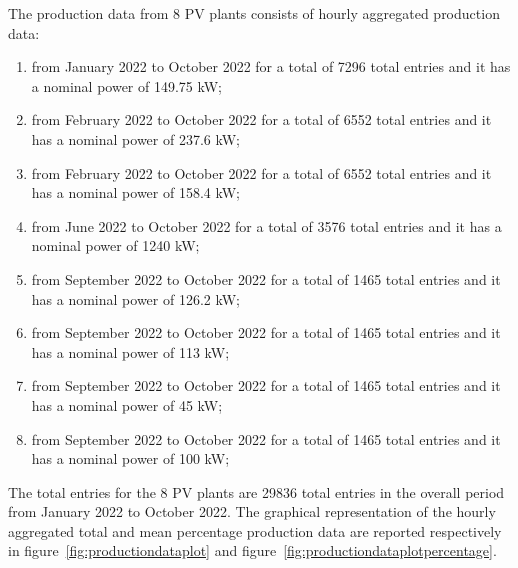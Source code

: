 The production data from 8 PV plants consists of hourly aggregated production data:
\begin{enumerate}
  \item from January 2022 to October 2022 for a total of 7296 total entries and it has a nominal power of 149.75 kW;
  \item from February 2022 to October 2022 for a total of 6552 total entries and it has a nominal power of 237.6 kW;
  \item from February 2022 to October 2022 for a total of 6552 total entries and it has a nominal power of 158.4 kW;
  \item from June 2022 to October 2022 for a total of 3576 total entries and it has a nominal power of 1240 kW;
  \item from September 2022 to October 2022 for a total of 1465 total entries and it has a nominal power of 126.2 kW;
  \item from September 2022 to October 2022 for a total of 1465 total entries and it has a nominal power of 113 kW;
  \item from September 2022 to October 2022 for a total of 1465 total entries and it has a nominal power of 45 kW;
  \item from September 2022 to October 2022 for a total of 1465 total entries and it has a nominal power of 100 kW;
\end{enumerate}
The total entries for the 8 PV plants are 29836 total entries in the overall period from January 2022 to October 2022.
The graphical representation of the hourly aggregated total and mean percentage production data are reported respectively in figure~\ref{fig:productiondataplot} and figure~\ref{fig:productiondataplotpercentage}.


